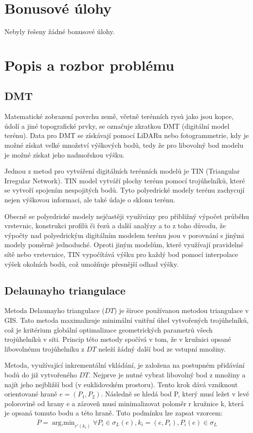 \documentclass[a4paper,12pt]{article}
\begin{document}
    \section{Bonusové úlohy}
    Nebyly řešeny žádné bonusové úlohy.

    \newpage
    \section{Popis a rozbor problému}
    \subsection{DMT}
    Matematické zobrazení povrchu země, včetně terénních rysů jako jsou kopce, údolí a jiné topografické prvky, se označuje zkratkou DMT (digitální model terénu). Data pro DMT se získávají pomocí LiDARu nebo fotogrammetrie, kdy je možné získat velké množství výškových bodů, tedy že pro libovolný bod modelu je možné získat jeho nadmořskou výšku.

    Jednou z metod pro vytváření digitálních terénních modelů je TIN (Triangular Irregular Network). TIN model vytváří plochy terénu pomocí trojúhelníků, které se vytvoří spojením nespojitých bodů. Tyto polyedrické modely terénu zachycují nejen výškovou informaci, ale také údaje o sklonu terénu.
    
    Obecně se polyedrické modely nejčastěji využívány pro přibližný výpočet průběhu vrstevnic, konstrukci profilů či řezů a další analýzy a to z toho důvodu, že výpočty nad polyedrickým digitálním modelem terénu jsou v porovnání s jinými modely poměrně jednoduché. Oproti jiným modelům, které využívají pravidelné sítě nebo vrstevnice, TIN vypočítává výšku pro každý bod pomocí interpolace výšek okolních bodů, což umožňuje přesnější odhad výšky.

    \subsection{Delaunayho triangulace}
    Metoda Delaunayho triangulace ($DT$) je široce používanou metodou triangulace v GIS. Tato metoda maximalizuje minimální vnitřní úhel vytvořených trojúhelníků, což je kritérium globální optimalizace geometrických parametrů všech trojúhelníků v síti. Princip této metody spočívá v tom, že v kružnici opsané libovolnému trojúhelníku z $DT$ neleží žádný další bod ze vstupní množiny. 
    
    Metoda, využívající inkrementální vkládání, je založena na postupném přidávání bodů do již vytvořeného $DT$. Nejprve je nutné vybrat libovolný bod z množiny a najít jeho nejbližší bod (v euklidovském prostoru). Tento krok dává vzniknout orientované hraně $e = (P_1, P_2)$. Následně se hledá bod P, který musí ležet v levé polorovině od hrany e a zároveň musí minimalizovat poloměr r kružnice k, která je opsaná tomuto bodu a této hraně. Tuto podmínku lze zapsat vzorcem:
    \begin{align*}
        P = \operatorname{arg,min}_{r'(k_i)} \forall P_i \in \sigma_L(e), k_i = (e, P_i), P_i(e) \in \sigma_L
    \end{align*}
    
\end{document}
